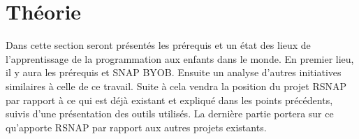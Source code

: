 \chapter{Théorie}
Dans cette section seront présentés les prérequis et un état des lieux de l'apprentissage de la programmation aux enfants dans le monde. En premier lieu, il y aura les prérequis et SNAP BYOB. Ensuite un analyse d'autres initiatives similaires à celle de ce travail. Suite à cela vendra la position du projet RSNAP par rapport à ce qui est déjà existant et expliqué dans les points précédents, suivis d'une présentation des outils utilisés. La dernière partie portera sur ce qu'apporte RSNAP par rapport aux autres projets existants. 





